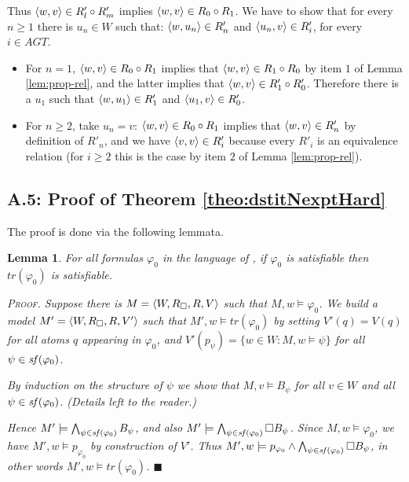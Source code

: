 \documentclass{article}
\newtheorem{lemma}{Lemma}
\newenvironment{pf}{\em \medskip\noindent \textsc{Proof.}}
{\hspace*{\fill}\nolinebreak[2]\hspace*{\fill}$\blacksquare$\medskip}
\renewcommand{\phi}{\varphi}
\newcommand{\agtset}{\ensuremath{\mathit{AGT}}}
\begin{document}
Thus $\langle w,v \rangle \in R'_l \circ R'_m $ implies $\langle w,v \rangle \in R_0 \circ R_1 $.
We have to show that for every $n \geq 1$ there is $u_n \in W$ such that:
$\langle w,u_n \rangle \in R'_n $ and $\langle u_n,v \rangle \in R'_i$, for every $i \in \agtset $.
\begin{itemize}
\item
For $n=1$, $\langle w,v \rangle \in R_0 \circ R_1 $ implies that
$\langle w,v \rangle \in R_1 \circ R_0$ by item $1$ of Lemma \ref{lem:prop-rel},
and the latter implies that $\langle w,v \rangle \in R'_1 \circ R'_0 $.
Therefore there is a $u_1$ such that $\langle w,u_1 \rangle\in R'_1 $ and $\langle u_1,v \rangle \in R'_0 $.
\item
For $n\geq 2$, take $u_n=v$:
$\langle w,v \rangle \in R_0 \circ R_1 $ implies that $\langle w,v \rangle \in R'_n $ by definition of $R'_n$, and
we have $\langle v,v \rangle \in R'_i $ because every $R'_i $ is an equivalence relation
(for $i \geq 2$ this is the case by item $2$ of Lemma \ref{lem:prop-rel}).
\end{itemize}




\subsection*{A.5: Proof of Theorem \ref{theo:dstitNexptHard}}

The proof is done via the following lemmata.

\begin{lemma}\label{lem:dsat2trcsat}
For all formulas $\phi_0 $ in the language of \DSTIT,
if   $   \phi_0  $ is satisfiable
then $tr(\phi_0) $ is satisfiable.

\begin{pf}
Suppose there is $M = \langle W,R_\Box,R,V \rangle $ such that  $M,w \models \phi_0 $.
We build a model $M' = \langle W,R_\Box,R,V' \rangle $ such that $M',w \models tr(\phi_0) $
by setting
$V'(q) = V(q) $ for all atoms $q $ appearing in $\phi_0$, and
$V'(p_\psi) = \{w\in W : M,w\models \psi \} $
for all $\psi \in \subfml(\phi_0) $.

By induction on the structure of $\psi$ we show that $M,v \models B_\psi $
for all $v \in W$ and all $\psi \in \subfml(\phi_0) $.
(Details left to the reader.)

Hence $M' \models \bigwedge_{\psi \in \subfml(\phi_0)}      B_\psi $, and also
      $M' \models \bigwedge_{\psi \in \subfml(\phi_0)} \Box B_\psi $.
Since $M,w \models \phi_0$, we have $M',w \models p_{\phi_0} $ by construction of $V'$.
Thus  $M',w \models p_{\phi_0} \land \bigwedge_{\psi \in \subfml(\phi_0)} \Box B_\psi $,
in other words
      $M',w \models tr(\phi_0) $.
\end{pf}
\end{lemma}
\end{document}
